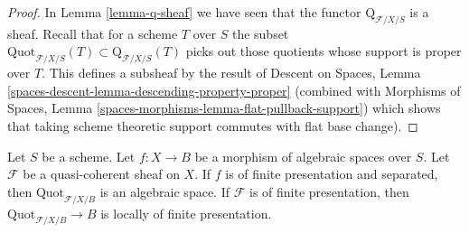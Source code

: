 \begin{proof}
In Lemma \ref{lemma-q-sheaf} we have seen that the functor
$\text{Q}_{\mathcal{F}/X/S}$ is a sheaf. Recall that for a
scheme $T$ over $S$ the subset
$\text{Quot}_{\mathcal{F}/X/S}(T) \subset \text{Q}_{\mathcal{F}/X/S}(T)$
picks out those quotients whose support is proper over $T$.
This defines a subsheaf by the result of
Descent on Spaces, Lemma \ref{spaces-descent-lemma-descending-property-proper}
(combined with
Morphisms of Spaces, Lemma \ref{spaces-morphisms-lemma-flat-pullback-support})
which shows that taking scheme theoretic support commutes
with flat base change).
\end{proof}

\begin{proposition}
\label{proposition-quot}
Let $S$ be a scheme. Let $f : X \to B$ be a morphism of algebraic
spaces over $S$. Let $\mathcal{F}$ be a quasi-coherent sheaf
on $X$. If $f$ is of finite presentation and separated, then
$\text{Quot}_{\mathcal{F}/X/B}$
is an algebraic space. If $\mathcal{F}$ is of finite presentation,
then $\text{Quot}_{\mathcal{F}/X/B} \to B$ is locally of finite presentation.
\end{proposition}

